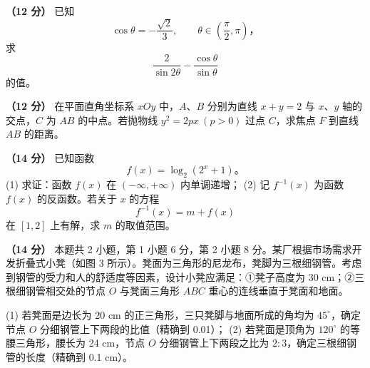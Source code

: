 \begin{question}
\textbf{（12 分）} 已知
\nopagebreak[4]
\[
\cos\theta=-\frac{\sqrt2}{3},\qquad \theta\in\left(\frac\pi2,\pi\right)\text{，}
\]
求
\nopagebreak[4]
\[
\frac2{\sin 2\theta}-\frac{\cos\theta}{\sin\theta}
\]
的值。

\end{question}
\begin{question}
\textbf{（12 分）} 在平面直角坐标系 \(xOy\) 中，\(A\text{、}B\) 分别为直线 \(x+y=2\) 与 \(x\text{、}y\) 轴的交点，\(C\) 为 \(AB\) 的中点。若抛物线 \(y^2=2px\ (p>0)\) 过点 \(C\)，求焦点 \(F\) 到直线 \(AB\) 的距离。

\end{question}
\begin{question}
\textbf{（14 分）} 已知函数
\nopagebreak[4]
\[
f(x)=\log_2(2^x+1)\text{。}
\]
(1) 求证：函数 \(f(x)\) 在 \((-\infty,+\infty)\) 内单调递增；
(2) 记 \(f^{-1}(x)\) 为函数 \(f(x)\) 的反函数。若关于 \(x\) 的方程
\nopagebreak[4]
\[
   f^{-1}(x)=m+f(x)
\]
   在 \([1,2]\) 上有解，求 \(m\) 的取值范围。

\Needspace{0.4\textheight}
\end{question}
\begin{question}
\textbf{（14 分）} 本题共 2 小题，第 1 小题 6 分，第 2 小题 8 分。某厂根据市场需求开发折叠式小凳（如图 3 所示）。凳面为三角形的尼龙布，凳脚为三根细钢管。考虑到钢管的受力和人的舒适度等因素，设计小凳应满足：①凳子高度为 30 cm；②三根细钢管相交处的节点 \(O\) 与凳面三角形 \(ABC\) 重心的连线垂直于凳面和地面。
\nopagebreak[4]
\begin{center}\end{center}
\nopagebreak[4]
(1) 若凳面是边长为 20 cm 的正三角形，三只凳脚与地面所成的角均为 \(45^\circ\)，确定节点 \(O\) 分细钢管上下两段的比值（精确到 0.01）；
(2) 若凳面是顶角为 \(120^\circ\) 的等腰三角形，腰长为 24 cm，节点 \(O\) 分细钢管上下两段之比为 \(2:3\)，确定三根细钢管的长度（精确到 0.1 cm）。

\end{question}
